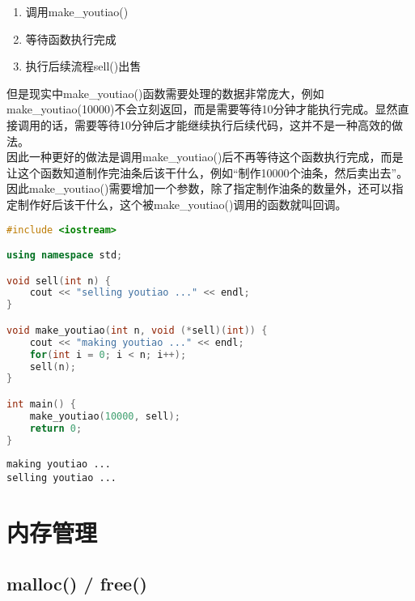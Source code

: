 \begin{enumerate}
	\item 调用make\_youtiao()
	\item 等待函数执行完成
	\item 执行后续流程sell()出售
\end{enumerate}

但是现实中make\_youtiao()函数需要处理的数据非常庞大，例如make\_youtiao(10000)不会立刻返回，而是需要等待10分钟才能执行完成。显然直接调用的话，需要等待10分钟后才能继续执行后续代码，这并不是一种高效的做法。\\

因此一种更好的做法是调用make\_youtiao()后不再等待这个函数执行完成，而是让这个函数知道制作完油条后该干什么，例如“制作10000个油条，然后卖出去”。\\

因此make\_youtiao()需要增加一个参数，除了指定制作油条的数量外，还可以指定制作好后该干什么，这个被make\_youtiao()调用的函数就叫回调。\\


\begin{lstlisting}[language=C++]
#include <iostream>

using namespace std;

void sell(int n) {
    cout << "selling youtiao ..." << endl;
}

void make_youtiao(int n, void (*sell)(int)) {
    cout << "making youtiao ..." << endl;
    for(int i = 0; i < n; i++);
    sell(n);
}

int main() {
    make_youtiao(10000, sell);
    return 0;
}
\end{lstlisting}

\begin{tcolorbox}
	\begin{verbatim}
making youtiao ...
selling youtiao ...
	\end{verbatim}
\end{tcolorbox}

\newpage

\section{内存管理}

\subsection{malloc() / free()}

